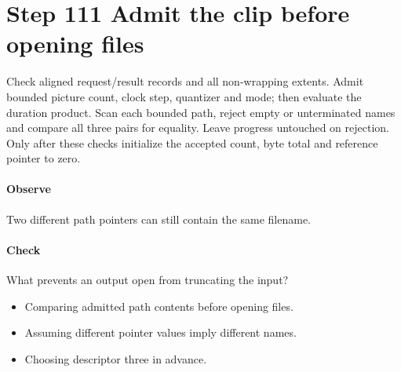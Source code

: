 \section{Step 111 Admit the clip before opening files}\label{h263-clip-s01}
Check aligned request/result records and all non-wrapping extents. Admit bounded
picture count, clock step, quantizer and mode; then evaluate the duration product.
Scan each bounded path, reject empty or unterminated names and compare all three
pairs for equality. Leave progress untouched on rejection. Only after these checks
initialize the accepted count, byte total and reference pointer to zero.

\paragraph{Observe} Two different path pointers can still contain the same filename.
\paragraph{Check} What prevents an output open from truncating the input?
\begin{itemize}
  \item[A.] Comparing admitted path contents before opening files.
  \item[B.] Assuming different pointer values imply different names.
  \item[C.] Choosing descriptor three in advance.
\end{itemize}
